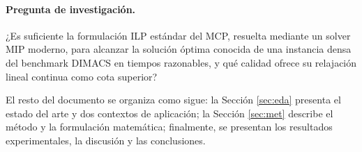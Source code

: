 \paragraph{Pregunta de investigación.} ¿Es suficiente la formulación ILP estándar del MCP, resuelta mediante un solver MIP moderno, para alcanzar la solución óptima conocida de una instancia densa del benchmark DIMACS en tiempos razonables, y qué calidad ofrece su relajación lineal continua como cota superior?

El resto del documento se organiza como sigue: la Sección \ref{sec:eda} presenta el estado del arte y dos contextos de aplicación; la Sección \ref{sec:met} describe el método y la formulación matemática; finalmente, se presentan los resultados experimentales, la discusión y las conclusiones.
